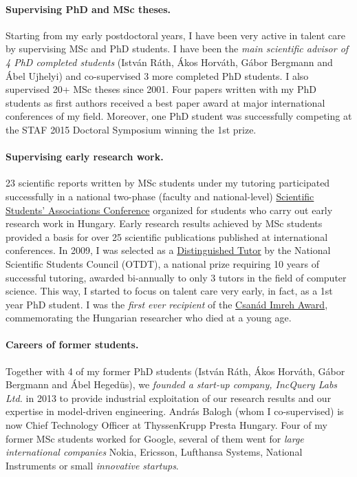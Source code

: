 \documentclass[a4paper,11pt]{report}
\begin{document}
\paragraph{Supervising PhD and MSc theses.}
Starting from my early postdoctoral years, I have been very active in talent care by supervising MSc and PhD students. I have been the \emph{main scientific advisor of 4 PhD completed students} (István Ráth, Ákos Horváth, Gábor Bergmann and Ábel Ujhelyi) and co-supervised 3 more completed PhD students. I also supervised 20+ MSc theses since 2001. Four papers written with my PhD students as first authors received a best paper award at major international conferences of my field. Moreover, one PhD student was successfully competing at the STAF 2015 Doctoral Symposium winning the 1st prize. 


\paragraph{Supervising early research work.} 
23 scientific reports written by MSc students under my tutoring participated successfully in a national two-phase (faculty and national-level) \href{http://www.otdt.hu/hu/cms/otdk/orszagos-tudomanyos-diakkori-konferencia/}{Scientific Students’ Associations Conference} organized for students who carry out early research work in Hungary. Early research results achieved by MSc students provided a basis for over 25 scientific publications published at international conferences. In 2009, I was selected as a \href{http://www.otdt.hu/page/kituntetesek/mak2009.php}{Distinguished Tutor} by the National Scientific Students Council (OTDT), a national prize requiring 10 years of successful tutoring, awarded bi-annually to only 3 tutors in the field of computer science. This way, I started to focus on talent care very early, in fact, as a 1st year PhD student. I was the \emph{first ever recipient} of the \href{https://otdk2017.mik.uni-pannon.hu/index.php/eredmenyek}{Csanád Imreh Award}, commemorating the Hungarian researcher who died %
at a young age. 

\paragraph{Careers of former students.} Together with 4 of my former PhD students (István Ráth, Ákos Horváth, Gábor Bergmann and Ábel Hegedüs), we \emph{founded a start-up company, IncQuery Labs Ltd.} in 2013 to provide industrial exploitation of our research results and our expertise in model-driven engineering. András Balogh (whom I co-supervised) is now Chief Technology Officer at ThyssenKrupp Presta Hungary. Four of my former MSc students worked for Google, several of them went for \emph{large international companies} Nokia, Ericsson, Lufthansa Systems, National Instruments or small \emph{innovative startups}.
\end{document}
